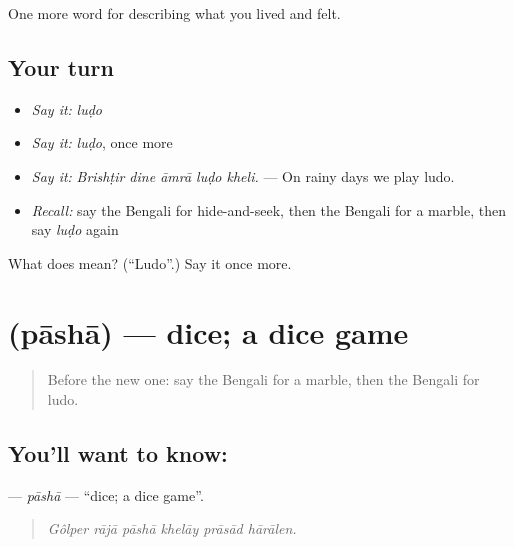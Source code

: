\begin{grammarlens}[title={What you've built}]
One more word for describing what you lived and felt.
\end{grammarlens}

\subsection*{Your turn}
\begin{itemize}
\raggedright
  \item \emph{Say it:} \emph{luḍo}
  \item \emph{Say it:} \emph{luḍo}, once more
  \item \emph{Say it:} \emph{Brishṭir dine āmrā luḍo kheli.} — On rainy days we play ludo.
  \item \emph{Recall:} say the Bengali for hide-and-seek, then the Bengali for a marble, then say \emph{luḍo} again
\end{itemize}

\begin{tcolorbox}[breakable,colback=teal!4,colframe=teal!35!black,title={Before you move on}]
What does  mean? (\textquotedblleft{}Ludo\textquotedblright{}.) Say it once more.
\end{tcolorbox}
\section[\texorpdfstring{\bn{পাশা} (pāshā)}{পাশা (pāshā)}]{ (pāshā) — dice; a dice game}

\label{lesson:BN-C518-pasha}



\begin{quote}
Before the new one: say the Bengali for a marble, then the Bengali for ludo.
\end{quote}

\subsection*{You'll want to know: }
\textbf{} — \emph{pāshā} — \textquotedblleft{}dice; a dice game\textquotedblright{}.

\begin{quote}
     
\end{quote}

\begin{quote}
\emph{Gôlper rājā pāshā khelāy prāsād hārālen.}
\end{quote}

